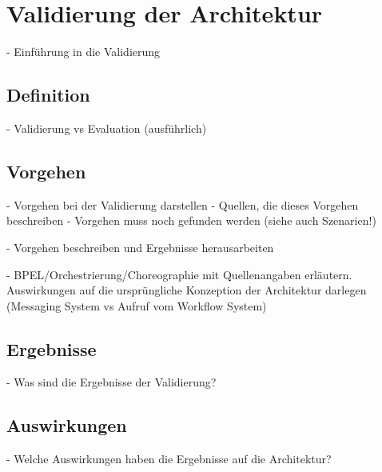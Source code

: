 
\chapter{Validierung der Architektur} %
\label{cha:validierung_der_architektur}

  - Einführung in die Validierung
  
\section{Definition} %
\label{sec:definition}

  - Validierung vs Evaluation (ausführlich)


\section{Vorgehen} %
\label{sec:vorgehen}

  - Vorgehen bei der Validierung darstellen
  - Quellen, die dieses Vorgehen beschreiben
  - Vorgehen muss noch gefunden werden (siehe auch Szenarien!)
  
  - Vorgehen beschreiben und Ergebnisse herausarbeiten

  - BPEL/Orchestrierung/Choreographie mit Quellenangaben erläutern. Auswirkungen auf die ursprüngliche Konzeption der Architektur darlegen (Messaging System vs Aufruf vom Workflow System)


\section{Ergebnisse} %
\label{sec:ergebnisse}

  - Was sind die Ergebnisse der Validierung?


\section{Auswirkungen} %
\label{sec:auswirkungen}

  - Welche Auswirkungen haben die Ergebnisse auf die Architektur?


